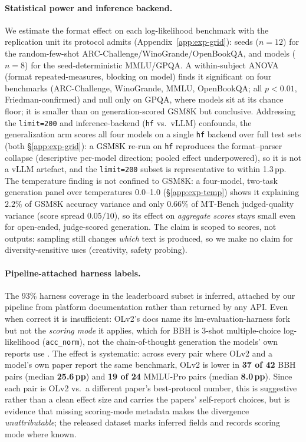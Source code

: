 \documentclass[11pt]{article}
\begin{document}
\paragraph{Statistical power and inference backend.} We estimate the format effect
on each log-likelihood benchmark with the replication unit its protocol admits
(Appendix~\ref{app:exp-grid}): seeds ($n{=}12$) for the random-few-shot
ARC-Challenge/WinoGrande/OpenBookQA, and models ($n{=}8$) for the seed-deterministic
MMLU/GPQA. A within-subject ANOVA (format repeated-measures, blocking on model)
finds it significant on four benchmarks (ARC-Challenge, WinoGrande, MMLU,
OpenBookQA; all $p<0.01$, Friedman-confirmed) and null only on GPQA, where models
sit at its chance floor; it is smaller than on generation-scored GSM8K but
conclusive. Addressing the \texttt{limit=200} and inference-backend (\texttt{hf}
vs.\ vLLM) confounds, the generalization arm scores all four models on a single
\texttt{hf} backend over full test sets (both \S\ref{app:exp-grid}): a GSM8K re-run
on \texttt{hf} reproduces the format--parser collapse (descriptive per-model
direction; pooled effect underpowered), so it is not a vLLM artefact, and the
\texttt{limit=200} subset is representative to within 1.3\,pp. The temperature
finding is not confined to GSM8K: a four-model, two-task generation panel over
temperatures 0.0--1.0 (\S\ref{app:exp-temp}) shows it explaining $2.2\%$ of GSM8K
accuracy variance and only $0.66\%$ of MT-Bench judged-quality variance (score
spread $0.05/10$), so its effect on \emph{aggregate scores} stays small even for
open-ended, judge-scored generation. The claim is scoped to scores, not outputs:
sampling still changes \emph{which} text is produced, so we make no claim for
diversity-sensitive uses (creativity, safety probing).

\paragraph{Pipeline-attached harness labels.} The 93\% harness coverage in the
leaderboard subset is inferred, attached by our pipeline from platform
documentation rather than returned by any API. Even when correct it is
insufficient: OLv2's docs name its lm-evaluation-harness fork but not the
\emph{scoring mode} it applies, which for BBH is 3-shot multiple-choice
log-likelihood (\texttt{acc\_norm}), not the chain-of-thought generation the
models' own reports use \citep{openllmv2about}. The effect is systematic: across
every pair where OLv2 and a model's own paper report the same benchmark, OLv2 is
lower in \textbf{37 of 42} BBH pairs (median \textbf{25.6\,pp}) and \textbf{19 of
24} MMLU-Pro pairs (median \textbf{8.0\,pp}). Since each pair is OLv2 vs.\ a
different paper's best-protocol number, this is suggestive rather than a clean
effect size and carries the papers' self-report choices, but is evidence that
missing scoring-mode metadata makes the divergence \emph{unattributable}; the
released dataset marks inferred fields and records scoring mode where known.
\end{document}

